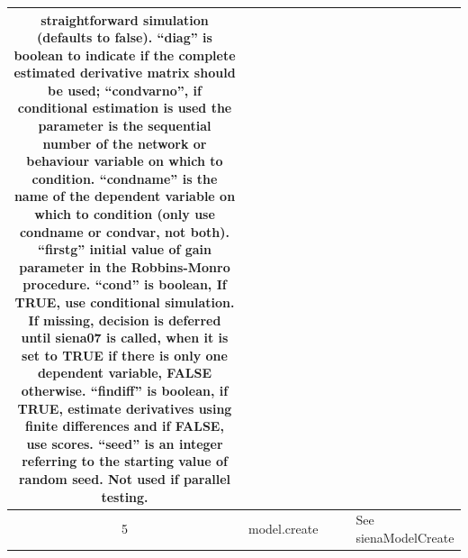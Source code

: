 \documentclass[a4paper,fleqn]{article}
\newcommand{\+}{\, + \,}
\begin{document}
{\begin{landscape}
\begin{longtable}{c | p{3cm} | p{5.2cm} | p{4.2cm} | p{8.5cm} }
straightforward simulation (defaults to false). ``diag'' is boolean to indicate
if the complete estimated derivative matrix should be used; ``condvarno'', if
conditional estimation is used the parameter is the sequential number of the
network or behaviour variable on which to condition. ``condname'' is the name
of the dependent variable on which to condition (only use condname or condvar,
not both). ``firstg'' initial value of gain parameter in the Robbins-Monro
procedure. ``cond'' is boolean, If TRUE, use conditional simulation. If
missing, decision is deferred until siena07 is called, when it is set to TRUE
if there is only one dependent variable, FALSE otherwise. ``findiff'' is
boolean, if TRUE, estimate derivatives using finite differences and if FALSE,
use scores. ``seed'' is an integer referring to the starting value of random
seed. Not used if parallel
testing.\\
\hline

5   & model.create  & & &       See sienaModelCreate\\
\hline


\end{longtable}
\end{landscape}}
\end{document}

